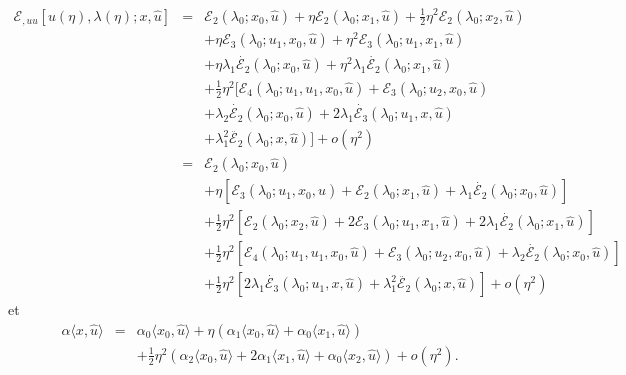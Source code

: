 \documentclass{article}
\newcommand{\nobracket}{}
\begin{document}
\begin{eqnarray*}
  \mathcal{E}_{, u  u} [u (\eta), \lambda (\eta) ; x, \hat{u}] & = &
  \mathcal{E}_2 (\lambda_0 ; x_0, \hat{u}) + \eta \mathcal{E}_2 (\lambda_0 ;
  x_1, \hat{u}) + \tfrac{1}{2} \eta^2 \mathcal{E}_2 (\lambda_0 ; x_2,
  \hat{u})\\
  &  & + \eta \mathcal{E}_3 (\lambda_0 ; u_1, x_0, \hat{u}) + \eta^2
  \mathcal{E}_3 (\lambda_0 ; u_1, x_1, \hat{u})\\
  &  & + \eta \lambda_1  \dot{\mathcal{E}_2} (\lambda_0 ; x_0, \hat{u}) +
  \eta^2 \lambda_1  \dot{\mathcal{E}_2} (\lambda_0 ; x_1, \hat{u})\\
  &  & + \tfrac{1}{2} \eta^2  [\mathcal{E}_4 (\lambda_0 ; u_1, u_1, x_0,
  \hat{u}) \nobracket +\mathcal{E}_3 (\lambda_0 ; u_2, x_0, \hat{u})\\
  &  & + \lambda_2  \dot{\mathcal{E}_2} (\lambda_0 ; x_0, \hat{u}) + 2
  \lambda_1  \dot{\mathcal{E}_3} (\lambda_0 ; u_1, x, \hat{u})\\
  &  & + \lambda_1^2  \ddot{\mathcal{E}_2} (\lambda_0 ; x, \hat{u})
  \nobracket] + o (\eta^2)\\
  & = & \mathcal{E}_2 (\lambda_0 ; x_0, \hat{u})\\
  &  & + \eta [\mathcal{E}_3 (\lambda_0 ; u_1, x_0, \hat{u}) +\mathcal{E}_2
  (\lambda_0 ; x_1, \hat{u}) + \lambda_1  \dot{\mathcal{E}_2} (\lambda_0 ;
  x_0, \hat{u})]\\
  &  & + \tfrac{1}{2} \eta^2  [\mathcal{E}_2 (\lambda_0 ; x_2, \hat{u}) +
  2\mathcal{E}_3 (\lambda_0 ; u_1, x_1, \hat{u}) + 2 \lambda_1
  \dot{\mathcal{E}_2} (\lambda_0 ; x_1, \hat{u})]\\
  &  & + \tfrac{1}{2} \eta^2  [\mathcal{E}_4 (\lambda_0 ; u_1, u_1, x_0,
  \hat{u}) +\mathcal{E}_3 (\lambda_0 ; u_2, x_0, \hat{u}) + \lambda_2
  \dot{\mathcal{E}_2} (\lambda_0 ; x_0, \hat{u})]\\
  &  & + \tfrac{1}{2} \eta^2  [2 \lambda_1  \dot{\mathcal{E}_3} (\lambda_0 ;
  u_1, x, \hat{u}) + \lambda_1^2  \ddot{\mathcal{E}_2} (\lambda_0 ; x,
  \hat{u})] + o (\eta^2)
\end{eqnarray*}
et
\begin{eqnarray*}
  \alpha \langle x, \hat{u} \rangle & = & \alpha_0  \langle x_0, \hat{u}
  \rangle + \eta (\alpha_1 \langle x_0, \hat{u} \rangle + \alpha_0 \langle
  x_1, \hat{u} \rangle)\\
  &  & + \tfrac{1}{2} \eta^2  (\alpha_2 \langle x_0, \hat{u} \rangle + 2
  \alpha_1 \langle x_1, \hat{u} \rangle + \alpha_0 \langle x_2, \hat{u}
  \rangle) + o (\eta^2) .
\end{eqnarray*}
\end{document}
